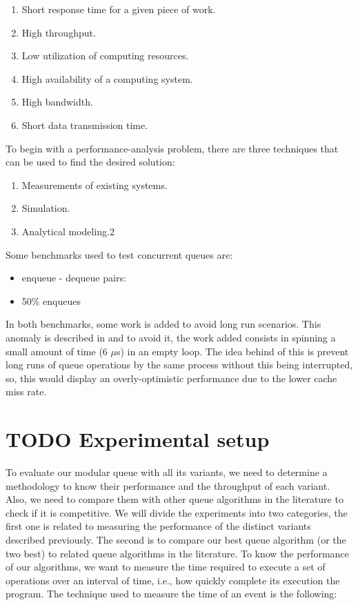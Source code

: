 \documentclass{latex/classes/thesis}
\begin{document}
\begin{enumerate}
\item Short response time for a given piece of work.
\item High throughput.
\item Low utilization of computing resources.
\item High availability of a computing system.
\item High bandwidth.
\item Short data transmission time.
\end{enumerate}

To begin with a performance-analysis problem, there are three techniques
that can be used to find the desired solution:

\begin{enumerate}
\item Measurements of existing systems.
\item Simulation.
\item Analytical modeling.2
\end{enumerate}

Some benchmarks used to test concurrent queues are:

\begin{itemize}
\item enqueue - dequeue pairs:
\item 50\% enqueues
\end{itemize}

In both benchmarks, some work is added to avoid long run scenarios. This
anomaly is described in \cite{DBLP_conf_podc_MichaelS96} and to avoid it, the
work added consists in spinning a small amount of time (6 \(\mu\)s) in an
empty loop. The idea behind of this is prevent long runs of queue operations
by the same process without this being interrupted, so, this would display
an overly-optimistic performance due to the lower cache miss rate.

\section{{\bfseries\sffamily TODO} Experimental setup}
\label{sec:org4585887}

To evaluate our modular queue with all its variants, we need to determine a
methodology to know their performance and the throughput of each
variant. Also, we need to compare them with other queue algorithms in the
literature to check if it is competitive. We will divide the experiments into
two categories, the first one is related to measuring the performance of the
distinct variants described previously. The second is to compare our best
queue algorithm (or the two best) to related queue algorithms in the
literature. To know the performance of our algorithms, we want to measure the
time required to execute a set of operations over an interval of time, i.e.,
how quickly complete its execution the program. The technique used to measure
the time of an event is the following:
\end{document}
